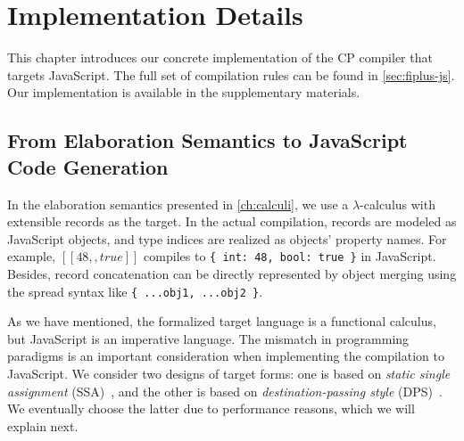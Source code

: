 \chapter{Implementation Details} \label{ch:compilation}

This chapter introduces our concrete implementation of the CP compiler that
targets JavaScript. The full set of compilation rules can be found in
\autoref{sec:fiplus-js}. Our implementation is available in the supplementary
materials.

\section{From Elaboration Semantics to JavaScript Code Generation}

In the elaboration semantics presented in \autoref{ch:calculi}, we use a
$\lambda$-calculus with extensible records as the target. In the actual
compilation, records are modeled as JavaScript objects, and type indices are
realized as objects' property names. For example, $[[48,,true]]$ compiles to
\lstinline|{ int: 48, bool: true }| in JavaScript. Besides, record concatenation
can be directly represented by object merging using the spread syntax like
\lstinline|{ ...obj1, ...obj2 }|.

As we have mentioned, the formalized target language is a functional calculus,
but JavaScript is an imperative language. The mismatch in programming paradigms
is an important consideration when implementing the compilation to JavaScript.
We consider two designs of target forms: one is based on \emph{static single
assignment} (SSA)~\citep{cytron1991efficiently}, and the other is based on
\emph{destination-passing style} (DPS)~\citep{shaikhha2017destination}. We
eventually choose the latter due to performance reasons, which we will explain
next.

